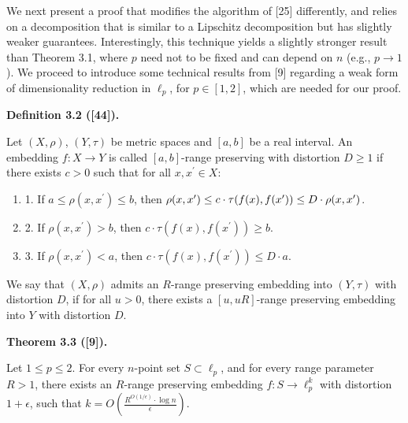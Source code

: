 \par
\par
We next present a proof that modifies the algorithm of [25] differently, and relies on a decomposition that is similar to a Lipschitz decomposition but has slightly weaker guarantees. Interestingly, this technique yields a slightly stronger result than Theorem 3.1, where $p$ need not to be fixed and can depend on $n$ (e.g., $p\to 1$). We proceed to introduce some technical results from [9] regarding a weak form of dimensionality reduction in $\ell_{p}$, for $p\in[1,2]$, which are needed for our proof.
\par
\par
\par\medskip\noindent\textbf{Definition 3.2 ([44]).}\par
Let $(X,\rho)$, $(Y,\tau)$ be metric spaces and $[a,b]$ be a real interval. An embedding $f:X\rightarrow Y$ is called $[a,b]$-range preserving with distortion $D\geq 1$  if there exists $c>0$ such that for all $x,x^{\prime}\in X$:
\par
\begin{enumerate}
\item  1. 
If $a\leq\rho(x,x^{\prime})\leq b$, then $\rho(x,x^{\prime})\leq c\cdot\tau(f(x),f(x^{\prime}))\leq D\cdot\rho(x,x^{%
\prime})$.
\par
\par
\item  2. 
If $\rho(x,x^{\prime})>b$, then $c\cdot\tau(f(x),f(x^{\prime}))\geq b$.
\par
\par
\item  3. 
If $\rho(x,x^{\prime})<a$, then $c\cdot\tau(f(x),f(x^{\prime}))\leq D\cdot a$.
\par
\par
\end{enumerate}
\par
\par
We say that $(X,\rho)$ admits an $R$-range preserving embedding into $(Y,\tau)$ with distortion $D$, if for all $u>0$, there exists a $[u,uR]$-range preserving embedding into $Y$ with distortion $D$.
\par
\par
\par\medskip\noindent\textbf{Theorem 3.3 ([9]).}\par
Let $1\leq p\leq 2$. For every $n$-point set $S\subset\ell_{p}$, and for every range parameter $R>1$, there exists an $R$-range preserving embedding $f:S\rightarrow\ell_{p}^{k}$ with distortion $1+\epsilon$, such that $k=O\left(\frac{R^{O(1/\epsilon)}\cdot\log n}{\epsilon}\right)$.
